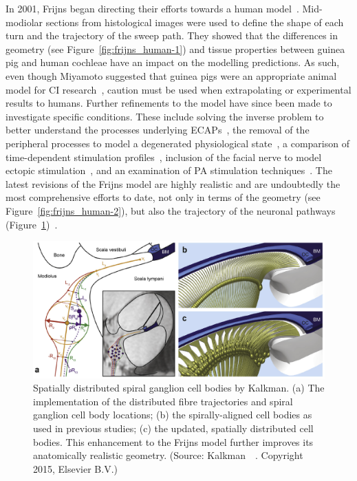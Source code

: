 In 2001, Frijns \etal{} began directing their efforts towards a human
model~\cite{frijns2001}. Mid-modiolar sections from histological images were
used to define the shape of each turn and the trajectory of the sweep path. They
showed that the differences in geometry (see Figure~\ref{fig:frijns_human-1})
and tissue properties between guinea pig and human cochleae have an impact on
the modelling predictions. As such, even though Miyamoto suggested that guinea
pigs were an appropriate animal model for CI research~\cite{miyamoto1986},
caution must be used when extrapolating \invivo{} or \insilico{} experimental
results to humans. Further refinements to the model have since been made to
investigate specific conditions. These include solving the inverse problem to
better understand the processes underlying ECAPs~\cite{briaire2005}, the removal
of the peripheral processes to model a degenerated physiological
state~\cite{briaire2006}, a comparison of time-dependent stimulation
profiles~\cite{frijns2009simultaneous}, inclusion of the facial nerve to model
ectopic stimulation~\cite{frijns2009stimulation}, and an examination of PA
stimulation techniques~\cite{frijns2011}. The latest revisions of the Frijns
model are highly realistic and are undoubtedly the most comprehensive efforts to
date, not only in terms of the geometry (see Figure~\ref{fig:frijns_human-2}),
but also the trajectory of the neuronal pathways
(Figure~\ref{fig:kalkman_ganglia})~\cite{kalkman2014,kalkman2015}.

\begin{figure}
	\centering
	\includegraphics[width=\textwidth]{Background/kalkman_ganglia}
	\caption[Spatially distributed spiral ganglion cell bodies by
	Kalkman]{Spatially distributed spiral ganglion cell bodies by Kalkman. (a)
	The implementation of the distributed fibre trajectories and spiral
	ganglion cell body locations; (b) the spirally-aligned cell bodies as used in
	previous studies; (c) the updated, spatially distributed cell bodies. This
	enhancement to the Frijns model further improves its anatomically realistic
	geometry. (Source: Kalkman~\etal~\cite{kalkman2015}. Copyright
	\textcopyright{} 2015, Elsevier B.V.)}
	\label{fig:kalkman_ganglia}
\end{figure}

